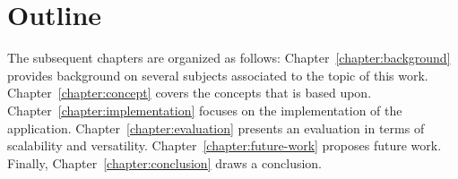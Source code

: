 \section{Outline}

The subsequent chapters are organized as follows: Chapter~\ref{chapter:background} provides background on several subjects associated to the topic of this work. Chapter~\ref{chapter:concept} covers the concepts that \tool is based upon. Chapter~\ref{chapter:implementation} focuses on the implementation of the application. Chapter~\ref{chapter:evaluation} presents an evaluation in terms of scalability and versatility. Chapter~\ref{chapter:future-work} proposes future work. Finally, Chapter~\ref{chapter:conclusion} draws a conclusion.
